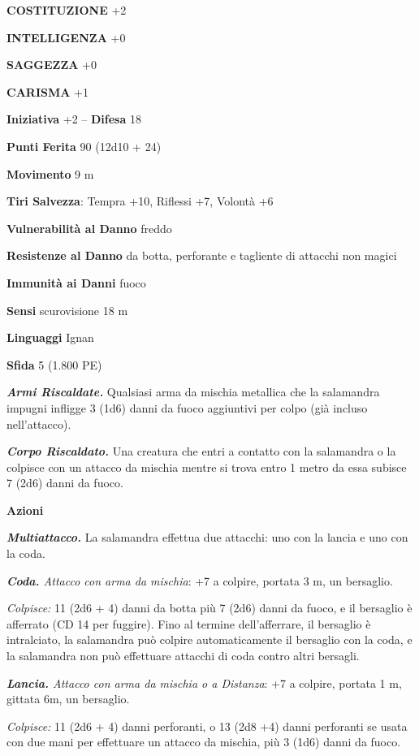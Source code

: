 \begin{multicols}{2}
\textbf{COSTITUZIONE} +2

\textbf{INTELLIGENZA} +0

\textbf{SAGGEZZA} +0

\textbf{CARISMA} +1

\textbf{Iniziativa} +2 -- \textbf{Difesa} 18

\textbf{Punti Ferita} 90 (12d10 + 24)

\textbf{Movimento} 9 m

\textbf{Tiri Salvezza}: Tempra +10, Riflessi +7, Volontà +6

\textbf{Vulnerabilità al Danno} freddo

\textbf{Resistenze al Danno} da botta, perforante e tagliente di attacchi non magici

\textbf{Immunità ai Danni} fuoco

\textbf{Sensi} scurovisione 18 m

\textbf{Linguaggi} Ignan

\textbf{Sfida} 5 (1.800 PE)

\emph{\textbf{Armi Riscaldate.}} Qualsiasi arma da mischia metallica che la salamandra impugni infligge 3 (1d6) danni da fuoco aggiuntivi per colpo (già incluso nell'attacco).

\emph{\textbf{Corpo Riscaldato.}} Una creatura che entri a contatto con la salamandra o la colpisce con un attacco da mischia mentre si trova entro 1 metro da essa subisce 7 (2d6) danni da fuoco.

\textbf{Azioni}

\emph{\textbf{Multiattacco.}} La salamandra effettua due attacchi: uno con la lancia e uno con la coda.

\emph{\textbf{Coda.} Attacco con arma da mischia}: +7 a colpire, portata 3 m, un bersaglio.

\emph{Colpisce:} 11 (2d6 + 4) danni da botta più 7 (2d6) danni da fuoco, e il bersaglio è afferrato (CD 14 per fuggire). Fino al termine dell'afferrare, il bersaglio è intralciato, la salamandra può colpire automaticamente il bersaglio con la coda, e la salamandra non può effettuare attacchi di coda contro altri bersagli.

\emph{\textbf{Lancia.} Attacco con arma da mischia o a Distanza}: +7 a colpire, portata 1 m, gittata 6m, un bersaglio.

\emph{Colpisce:} 11 (2d6 + 4) danni perforanti, o 13 (2d8 +4) danni perforanti se usata con due mani per effettuare un attacco da mischia, più 3 (1d6) danni da fuoco.


\end{multicols}
